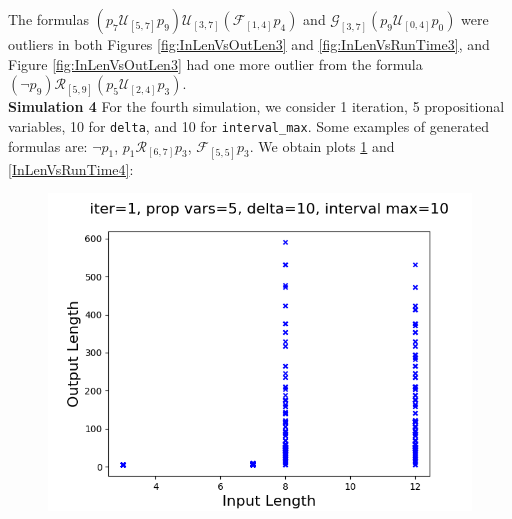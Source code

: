 \documentclass[runningheads]{llncs}
\begin{document}
The formulas $(p_7 \mathcal{U}_{[5,7]} p_9) \mathcal{U}_{[3,7]} (\mathcal{F}_{[1,4]} p_4)$ and $\mathcal{G}_{[3,7]} (p_9 \mathcal{U}_{[0,4]} p_0)$ were outliers in both Figures \ref{fig:InLenVsOutLen3} and \ref{fig:InLenVsRunTime3}, and Figure \ref{fig:InLenVsOutLen3} had one more outlier from the formula $(\neg p_9) \mathcal{R}_{[5,9]} (p_5 \mathcal{U}_{[2,4]} p_3)$.
\\
\noindent\textbf{Simulation 4}
For the fourth simulation, we consider 1 iteration, 5 propositional variables, 10 for \texttt{delta}, and 10 for \texttt{interval\_max}. Some examples of generated formulas are: $\neg p_1$, $p_1 \mathcal{R}_{[6,7]} p_3$, $\mathcal{F}_{[5,5]} p_3$. We obtain plots \ref{InLenVsOutLen4} and \ref{InLenVsRunTime4}:\\
\begin{minipage}{0.5 \textwidth}
    \begin{figure}[H]
    \centering
    \includegraphics[scale=0.35]{images/Sim4Length_large.png}
    \label{InLenVsOutLen4}
    \end{figure}
\end{minipage}%
\end{document}
